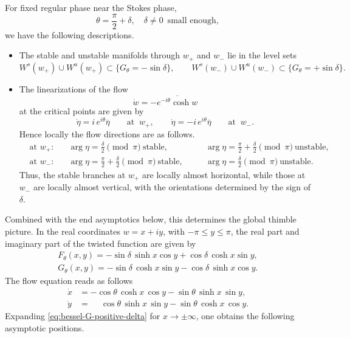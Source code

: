 \documentclass[11pt]{amsart}
\theoremstyle{plain}
\begin{document}
For fixed regular phase near the Stokes phase, 
\[\theta=\frac{\pi}{2}+\delta,\quad \delta\ne0 \,\text{ small enough},\]
we have the following descriptions. 
\begin{itemize}
    \item The stable and unstable manifolds through $w_+$ and $w_-$ lie in the level sets
\[
W^s(w_+)\cup W^u(w_+) \subset \{G_\theta=-\sin\delta\},
\qquad
W^s(w_-)\cup W^u(w_-) \subset \{G_\theta=+\sin\delta\}.
\]
\item The linearizations of the flow
\[
\dot{w}=-\overline{e^{-i\theta}\cosh w}
\]
at the critical points are given by
\[
\dot{\eta}=i\,e^{i\theta}\overline{\eta}
\qquad\text{at }~w_+,
\qquad
\dot{\eta}=-i\,e^{i\theta}\overline{\eta}
\qquad\text{at }~w_-.
\]
Hence locally the flow directions are as follows.
\[
\begin{aligned}
&\text{at }w_+:
&&\arg\eta=\frac{\delta}{2}\pmod{\pi}\ \text{stable},
&&\quad\arg\eta=\frac{\pi}{2}+\frac{\delta}{2}\pmod{\pi}\ \text{unstable},
\\
&\text{at }w_-:
&&\arg\eta=\frac{\pi}{2}+\frac{\delta}{2}\pmod{\pi}\ \text{stable},
&&\quad\arg\eta=\frac{\delta}{2}\pmod{\pi}\ \text{unstable}.
\end{aligned}
\]
Thus, the stable branches at \(w_+\) are locally almost horizontal, while those at \(w_-\) are locally almost vertical, with the orientations determined by the sign of $\delta$. 
\end{itemize}

Combined with the end asymptotics below, this determines the global thimble picture. In the real coordinates \(w=x+iy\), with \(-\pi\le y\le \pi\), the real part and imaginary part of the twisted function are given by
\begin{equation}\label{eq:bessel-G-positive-delta}
\begin{aligned}
F_\theta(x,y)
=
-\sin\delta\,\sinh x\cos y
+
\cos\delta\,\cosh x\sin y,\\ 
G_\theta(x,y)
=
-\sin\delta\,\cosh x\sin y
-
\cos\delta\,\sinh x\cos y.
\end{aligned}
\end{equation}
The flow equation reads as follows
\begin{equation*}\label{eq:bessel-flow-real-general}
\begin{aligned}
\dot{x}&=-\cos\theta\,\cosh x\,\cos y-\sin\theta\,\sinh x\,\sin y,\\
\dot{y}&=\phantom{-}\cos\theta\,\sinh x\,\sin y-\sin\theta\,\cosh x\,\cos y.
\end{aligned}
\end{equation*}
Expanding \eqref{eq:bessel-G-positive-delta} for \(x\to\pm\infty\), one obtains the following asymptotic positions.
\end{document}

